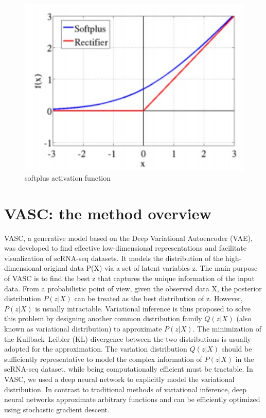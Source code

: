 \documentclass[12 pts]{article}
\begin{document}
\begin{figure}[H]
\centering
\includegraphics[scale=0.85]{softplus}
\caption{softplus activation function}
\label{fig: softplus}
\end{figure}


\section{VASC: the method overview}

VASC, a generative model based on the Deep Variational Autoencoder (VAE), was developed to find effective low-dimensional representations and facilitate visualization of scRNA-seq datasets. It models the distribution of the high-dimensional original data P(X) via a set of latent variables z. The main purpose of VASC is to find the best z that captures the unique information of the input data. From a probabilistic point of view, given the observed data X, the posterior distribution $P(z|X)$ can be treated as the best distribution of z. However, $P(z|X)$ is usually intractable. Variational inference is thus proposed to solve this problem by designing another common distribution family $Q(z|X)$ (also known as variational distribution) to approximate $P(z|X)$. The minimization of the Kullback–Leibler (KL) divergence between the two distributions is usually adopted for the approximation. The variation distribution $Q(z|X)$ should be sufficiently representative to model the complex information of $P(z|X)$ in the scRNA-seq dataset, while being computationally efficient must be tractable. In VASC, we used a deep neural network to explicitly model the variational distribution. In contrast to traditional methods of variational inference, deep neural networks approximate arbitrary functions and can be efficiently optimized using stochastic gradient descent.
\end{document}

